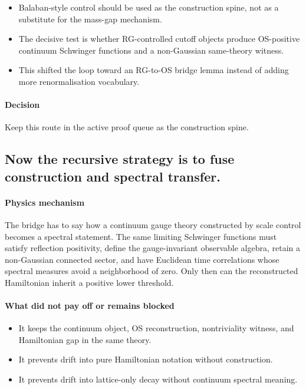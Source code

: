 \documentclass[11pt]{article}
\begin{document}
\begin{itemize}
\item Balaban-style control should be used as the construction spine, not as a substitute for the mass-gap mechanism.
\item The decisive test is whether RG-controlled cutoff objects produce OS-positive continuum Schwinger functions and a non-Gaussian same-theory witness.
\item This shifted the loop toward an RG-to-OS bridge lemma instead of adding more renormalisation vocabulary.
\end{itemize}

\paragraph{Decision}

Keep this route in the active proof queue as the construction spine.

\subsection*{Now the recursive strategy is to fuse construction and spectral transfer.}

\paragraph{Physics mechanism}

The bridge has to say how a continuum gauge theory constructed by scale control becomes a spectral statement. The same limiting Schwinger functions must satisfy reflection positivity, define the gauge-invariant observable algebra, retain a non-Gaussian connected sector, and have Euclidean time correlations whose spectral measures avoid a neighborhood of zero. Only then can the reconstructed Hamiltonian inherit a positive lower threshold.

\paragraph{What did not pay off or remains blocked}

\begin{itemize}
\item It keeps the continuum object, OS reconstruction, nontriviality witness, and Hamiltonian gap in the same theory.
\item It prevents drift into pure Hamiltonian notation without construction.
\item It prevents drift into lattice-only decay without continuum spectral meaning.
\end{itemize}
\end{document}

